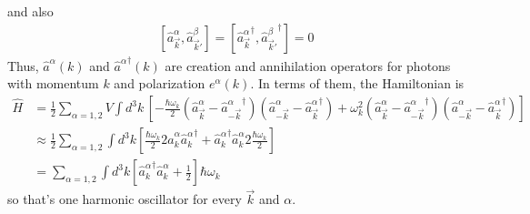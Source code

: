 and also
\begin{align}
    \left[ \hat{a}_{\vec{k}}^{\alpha}, \hat{a}_{\vec{k}'}^{\beta} \right] =
    \left[
    {\hat{a}_{\vec{k}}^{\alpha}}^\dagger,
    {\hat{a}_{\vec{k}'}^{\beta}}^\dagger
    \right] = 0
\end{align}
Thus,
$\hat{a}^\alpha(k)$ and ${\hat{a}^{\alpha}}^\dagger(k)$
are creation and annihilation operators for photons with momentum $k$ and
polarization $e^{\alpha}(k)$.
In terms of them,
the Hamiltonian is
\begin{align}
    \hat{H} &=
    \frac{1}{2} \sum_{\alpha=1,2} V \int d^3k\,\left[
    -\frac{\hbar\omega_k}{2}
    \left( 
    \hat{a}_{\vec{k}}^{\alpha}
    - {\hat{a}_{-\vec{k}}^{\alpha}}^\dagger
    \right)
    \left( 
    \hat{a}_{-\vec{k}}^{\alpha}
    - {\hat{a}_{\vec{k}}^{\alpha}}^\dagger
    \right)
    +
    \omega_k^2
    \left( 
    \hat{a}_{\vec{k}}^{\alpha}
    - {\hat{a}_{-\vec{k}}^{\alpha}}^\dagger
    \right)
    \left( 
    \hat{a}_{-\vec{k}}^{\alpha}
    - {\hat{a}_{\vec{k}}^{\alpha}}^\dagger
    \right)
    \right]\\
    &\approx
    \frac{1}{2} \sum_{\alpha=1,2} \int d^3k\left[ 
    \frac{\hbar\omega_k}{2} 2
    \hat{a}_{k}^{\alpha}
    {\hat{a}_{k}^{\alpha}}^\dagger
    +
    {\hat{a}_{k}^{\alpha}}^\dagger
    \hat{a}_{k}^{\alpha}
    2
    \frac{\hbar\omega_k}{2}
    \right]\\
    &=
    \sum_{\alpha=1,2} \int d^3k\left[ 
    {\hat{a}_{k}^{\alpha}}^\dagger
    \hat{a}_{k}^{\alpha}
    +
    \frac{1}{2}
    \right]
    \hbar\omega_k
\end{align}
so that's one harmonic oscillator for every $\vec{k}$ and $\alpha$.

